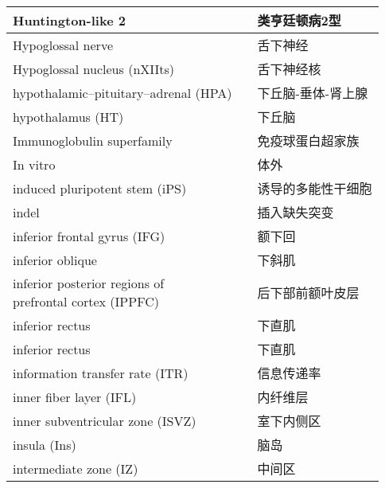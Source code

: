 \begin{longtable}{lll}
	\midrule
	Huntington-like 2     &&  类亨廷顿病2型  \\
	
	\midrule
	Hypoglossal nerve     &&  舌下神经  \\
	
	\midrule
	Hypoglossal nucleus (nXIIts)    &&  舌下神经核  \\
	
	\midrule
	hypothalamic–pituitary–adrenal (HPA)     &&  下丘脑-垂体-肾上腺  \\
	
	\midrule
	hypothalamus (HT)     &&  下丘脑  \\
	
	\midrule
	Immunoglobulin superfamily   && 免疫球蛋白超家族  \\
	
	\midrule
	In vitro   && 体外  \\
	
	\midrule
	induced pluripotent stem (iPS)  && 诱导的多能性干细胞  \\
	
	\midrule
	indel   && 插入缺失突变  \\
	
	\midrule
	inferior frontal gyrus (IFG)   && 额下回  \\
	
	\midrule
	inferior oblique   && 下斜肌  \\
	
	\midrule
	\makecell{inferior posterior regions of \\ prefrontal cortex (IPPFC)}  && 后下部前额叶皮层  \\
	
	\midrule
	inferior rectus   && 下直肌  \\
	
	\midrule
	inferior rectus   && 下直肌  \\
	
	\midrule
	information transfer rate (ITR)   && 信息传递率  \\
	
	\midrule
	inner fiber layer (IFL)   && 内纤维层  \\
	
	\midrule
	inner subventricular zone (ISVZ)   && 室下内侧区  \\
	
	\midrule
	insula (Ins)   && 脑岛  \\
	
	\midrule
	intermediate zone (IZ)  && 中间区  \\
	

\end{longtable}
